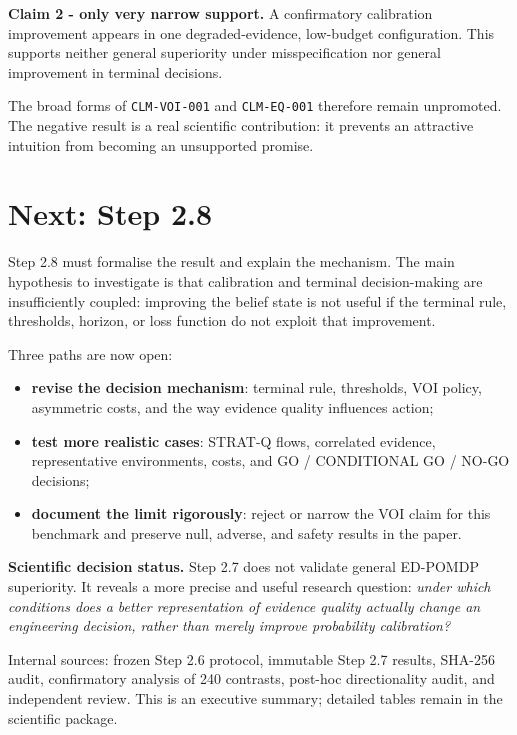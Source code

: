 \documentclass[11pt,a4paper]{article}
\newcommand{\claimvoi}{\texttt{CLM-VOI-001}}
\newcommand{\claimeq}{\texttt{CLM-EQ-001}}
\begin{document}
\begin{tcolorbox}[colback=softgreen,colframe=green!45!black,boxrule=0.7pt,arc=2mm]
\textbf{Claim 2 - only very narrow support.} A confirmatory calibration improvement appears in one degraded-evidence, low-budget configuration. This supports neither general superiority under misspecification nor general improvement in terminal decisions.
\end{tcolorbox}

The broad forms of \claimvoi{} and \claimeq{} therefore remain unpromoted. The negative result is a real scientific contribution: it prevents an attractive intuition from becoming an unsupported promise.

\section*{Next: Step 2.8}

Step 2.8 must formalise the result and explain the mechanism. The main hypothesis to investigate is that calibration and terminal decision-making are insufficiently coupled: improving the belief state is not useful if the terminal rule, thresholds, horizon, or loss function do not exploit that improvement.

Three paths are now open:

\begin{itemize}
  \item \textbf{revise the decision mechanism}: terminal rule, thresholds, VOI policy, asymmetric costs, and the way evidence quality influences action;
  \item \textbf{test more realistic cases}: STRAT-Q flows, correlated evidence, representative environments, costs, and GO / CONDITIONAL GO / NO-GO decisions;
  \item \textbf{document the limit rigorously}: reject or narrow the VOI claim for this benchmark and preserve null, adverse, and safety results in the paper.
\end{itemize}

\begin{tcolorbox}[colback=softblue,colframe=deepblue,boxrule=0.7pt,arc=2mm]
\textbf{Scientific decision status.} Step 2.7 does not validate general ED-POMDP superiority. It reveals a more precise and useful research question: \emph{under which conditions does a better representation of evidence quality actually change an engineering decision, rather than merely improve probability calibration?}
\end{tcolorbox}

\vfill
{\small\color{muted}Internal sources: frozen Step 2.6 protocol, immutable Step 2.7 results, SHA-256 audit, confirmatory analysis of 240 contrasts, post-hoc directionality audit, and independent review. This is an executive summary; detailed tables remain in the scientific package.}
\end{document}
